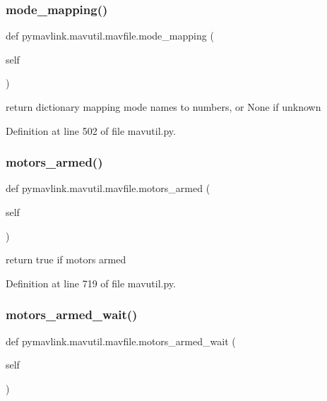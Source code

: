 \subsubsection{\texorpdfstring{mode\_mapping()}{mode\_mapping()}}
{\footnotesize\ttfamily def pymavlink.\+mavutil.\+mavfile.\+mode\+\_\+mapping (\begin{DoxyParamCaption}\item[{}]{self }\end{DoxyParamCaption})}

\begin{DoxyVerb}return dictionary mapping mode names to numbers, or None if unknown\end{DoxyVerb}
 

Definition at line 502 of file mavutil.\+py.

\mbox{\label{classpymavlink_1_1mavutil_1_1mavfile_a335d09b6fa521448d97ea2597d0387c0}} 
\subsubsection{\texorpdfstring{motors\_armed()}{motors\_armed()}}
{\footnotesize\ttfamily def pymavlink.\+mavutil.\+mavfile.\+motors\+\_\+armed (\begin{DoxyParamCaption}\item[{}]{self }\end{DoxyParamCaption})}

\begin{DoxyVerb}return true if motors armed\end{DoxyVerb}
 

Definition at line 719 of file mavutil.\+py.

\mbox{\label{classpymavlink_1_1mavutil_1_1mavfile_a05ead7d3ad2e1228d222592ab34e8585}} 
\subsubsection{\texorpdfstring{motors\_armed\_wait()}{motors\_armed\_wait()}}
{\footnotesize\ttfamily def pymavlink.\+mavutil.\+mavfile.\+motors\+\_\+armed\+\_\+wait (\begin{DoxyParamCaption}\item[{}]{self }\end{DoxyParamCaption})}

